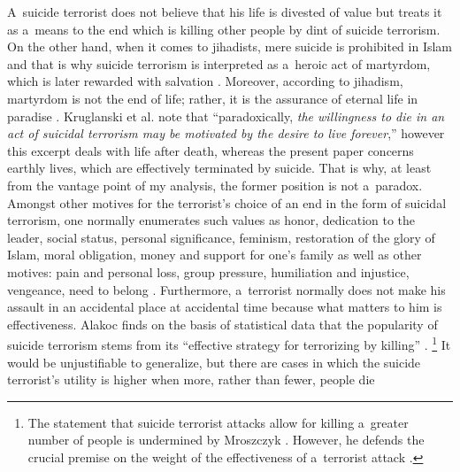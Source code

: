 A~suicide terrorist does not believe that his life is divested of value but treats it as a~means to the end which is killing other people by dint of suicide terrorism. On the other hand, when it comes to jihadists, mere suicide is prohibited in Islam and that is why suicide terrorism is interpreted as a~heroic act of martyrdom, which is later rewarded with salvation 
\parencites[see][pp.27–33]{}[][pp.15–24]{}. %
 Moreover, according to jihadism, martyrdom is not the end of life; rather, it is the assurance of eternal life in paradise 
\parencite[][p.336]{}. %
 Kruglanski et al. 
\parencite*[][p.336]{} %
 note that ``paradoxically, \textit{the willingness to die in an act of suicidal terrorism may be motivated by the desire to live forever},'' however this excerpt deals with life after death, whereas the present paper concerns earthly lives, which are effectively terminated by suicide. That is why, at least from the vantage point of my analysis, the former position is not a~paradox. Amongst other motives for the terrorist's choice of an end in the form of suicidal terrorism, one normally enumerates such values as honor, dedication to the leader, social status, personal significance, feminism, restoration of the glory of Islam, moral obligation, money and support for one's family as well as other motives: pain and personal loss, group pressure, humiliation and injustice, vengeance, need to belong 
\parencite[cited in][p.332]{}. %
 Furthermore, a~terrorist normally does not make his assault in an accidental place at accidental time because what matters to him is effectiveness. Alakoc 
\parencite*[][p.1]{} %
 finds on the basis of statistical data that the popularity of suicide terrorism stems from its ``effective strategy for terrorizing by killing'' 
\parencites[see also][pp.7–11]{}[][pp.81–92]{}.%
\footnote{The statement that suicide terrorist attacks allow for killing a~greater number of people is undermined by Mroszczyk 
\parencite*[][]{}. %
 However, he defends the crucial premise on the weight of the effectiveness of a~terrorist attack 
\parencite[see][pp.346–366]{}.%
} It would be unjustifiable to generalize, but there are cases in which the suicide terrorist's utility is higher when more, rather than fewer, people die 
